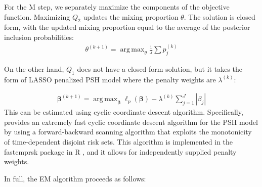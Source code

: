 \documentclass[11pt,a4paper]{article}
\DeclareMathOperator*{\argmax}{arg\,max}
\let\cite\parencite
\begin{document}
For the M step, we separately maximize the components of the objective function. Maximizing $Q_2$ updates the mixing proportion $\theta$. The solution is closed form, with the updated mixing proportion equal to the average of the posterior inclusion probabilities:
\begin{align*}
    \theta^{(k+1)}= \argmax_{\theta} \frac{1}{J}\sum p_j^{(k)}
\end{align*}

\noindent On the other hand, $Q_1$ does not have a closed form solution, but it takes the form of LASSO penalized PSH model where the penalty weights are $\lambda^{(k)}$:

\begin{align*}
    \boldsymbol{\beta}^{(k+1)}= \argmax_{\boldsymbol{\beta}} \ell_p(\boldsymbol{\beta}) - \lambda^{(k)}\sum_{j=1}^J |\beta_j|
\end{align*}
This can be estimated using cyclic coordinate descent algorithm. Specifically, \cite{Kawaguchi2020} provides an extremely fast cyclic coordinate descent algorithm for the PSH model by using a forward-backward scanning algorithm that exploits the monotonicity of time-dependent disjoint risk sets. This algorithm is implemented in the fastcmprsk package in R \cite{Kawaguchi2021}, and it allows for independently supplied penalty weights.

In full, the EM algorithm proceeds as follows:
\end{document}
